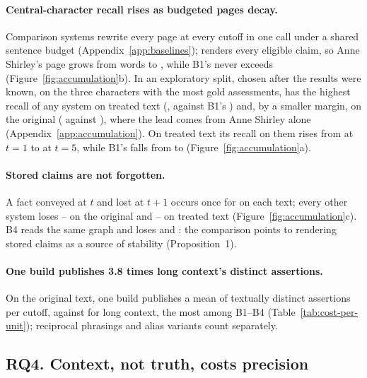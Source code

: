 \paragraph{Central-character recall rises as budgeted pages decay.}
Comparison systems rewrite every page at every cutoff in one call under a shared sentence
budget (Appendix~\ref{app:baselines}); \sys renders every eligible claim, so Anne Shirley's
page grows from  words to , while B1's never exceeds
 (Figure~\ref{fig:accumulation}b). In an exploratory split, chosen after the results were
known, on the three characters with the most gold assessments, \sys has the highest recall of
any system on treated text (, against B1's )
and, by a smaller margin, on the original ( against
), where the lead comes from Anne Shirley alone
(Appendix~\ref{app:accumulation}). On treated text its recall on them rises from
 at $t=1$ to  at $t=5$, while B1's falls
from  to  (Figure~\ref{fig:accumulation}a).

\paragraph{Stored claims are not forgotten.}
A fact conveyed at $t$ and lost at $t+1$ occurs once for \sys on each text; every other
system loses -- on the original and
-- on treated text
(Figure~\ref{fig:accumulation}c). B4 reads the same graph and loses  and
: the comparison points to rendering stored claims as a source of
stability (Proposition~1).

\paragraph{One build publishes 3.8 times long context's distinct assertions.}
On the original text, one build publishes a mean of  textually
distinct assertions per cutoff, against  for long context, the most
among B1--B4 (Table~\ref{tab:cost-per-unit}); reciprocal phrasings and alias variants count
separately.



\subsection{RQ4. Context, not truth, costs precision}
\label{sec:results-quality}


